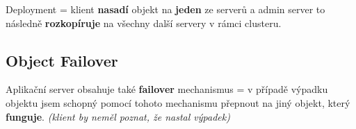 \vspace{4pt}
\noindent Deployment = klient \textbf{nasadí} objekt na \textbf{jeden} ze serverů a admin server to následně \textbf{rozkopíruje} na všechny další servery v rámci clusteru.

\subsection{Object Failover}

Aplikační server obsahuje také \textbf{failover} mechanismus = v případě výpadku objektu jsem schopný pomocí tohoto mechanismu přepnout na jiný objekt, který \textbf{funguje}. \textit{(klient by neměl poznat, že nastal výpadek)}
